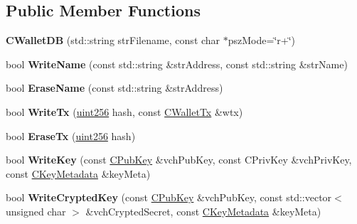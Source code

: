 \subsection*{Public Member Functions}
\begin{DoxyCompactItemize}
\item 
\mbox{\label{class_c_wallet_d_b_a61b22627c0bb1ca603bc7e671566f9c3}} 
{\bfseries C\+Wallet\+DB} (std\+::string str\+Filename, const char $\ast$psz\+Mode=\char`\"{}r+\char`\"{})
\item 
\mbox{\label{class_c_wallet_d_b_ad1b3bce77e9dd6ddd8c668a469c38f0a}} 
bool {\bfseries Write\+Name} (const std\+::string \&str\+Address, const std\+::string \&str\+Name)
\item 
\mbox{\label{class_c_wallet_d_b_a319209fcf90ea860b668b92c44a3fa7a}} 
bool {\bfseries Erase\+Name} (const std\+::string \&str\+Address)
\item 
\mbox{\label{class_c_wallet_d_b_a76d2ca02898221ab66df5d5f7491164e}} 
bool {\bfseries Write\+Tx} (\mbox{\hyperlink{classuint256}{uint256}} hash, const \mbox{\hyperlink{class_c_wallet_tx}{C\+Wallet\+Tx}} \&wtx)
\item 
\mbox{\label{class_c_wallet_d_b_a498e00c693cacc4b558e6f5295ea32f2}} 
bool {\bfseries Erase\+Tx} (\mbox{\hyperlink{classuint256}{uint256}} hash)
\item 
\mbox{\label{class_c_wallet_d_b_a7ebef5e0c7f604aa2159ba96d527e3a2}} 
bool {\bfseries Write\+Key} (const \mbox{\hyperlink{class_c_pub_key}{C\+Pub\+Key}} \&vch\+Pub\+Key, const C\+Priv\+Key \&vch\+Priv\+Key, const \mbox{\hyperlink{class_c_key_metadata}{C\+Key\+Metadata}} \&key\+Meta)
\item 
\mbox{\label{class_c_wallet_d_b_a914fb53d1731daf9b486f164dd325210}} 
bool {\bfseries Write\+Crypted\+Key} (const \mbox{\hyperlink{class_c_pub_key}{C\+Pub\+Key}} \&vch\+Pub\+Key, const std\+::vector$<$ unsigned char $>$ \&vch\+Crypted\+Secret, const \mbox{\hyperlink{class_c_key_metadata}{C\+Key\+Metadata}} \&key\+Meta)
\item 
\mbox{\label{class_c_wallet_d_b_a507690da431ef61244941ad39c308aeb}} 

\end{DoxyCompactItemize}
